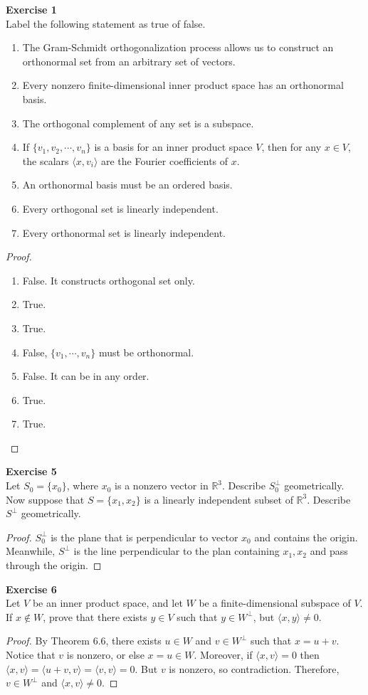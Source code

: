 \documentclass[12pt, a4paper]{article}
\theoremstyle{plain}
\newcommand{\R}{\mathbb{R}}
\newenvironment{exercise}[2][Exercise]
    { \begin{mdframed}[backgroundcolor=gray!20] \textbf{#1 #2} \\}
    {  \end{mdframed}}
\begin{document}
\begin{exercise}{1}
Label the following statement as true of false.
\begin{enumerate}[label=(\alph*)]
\item The Gram-Schmidt orthogonalization process allows us to construct an orthonormal set from an arbitrary set of vectors.
\item Every nonzero finite-dimensional inner product space has an orthonormal basis.
\item The orthogonal complement of any set is a subspace.
\item If $\{v_1,v_2,\cdots,v_n\}$ is a basis for an inner product space $V$, then for any $x\in V$, the scalars $\langle{x,v_i}\rangle$ are the Fourier coefficients of $x$.
\item An orthonormal basis must be an ordered basis.
\item Every orthogonal set is linearly independent.
\item Every orthonormal set is linearly independent.
\end{enumerate}
\end{exercise}
\begin{proof}
\hfill
\begin{enumerate}[label=(\alph*)]
\item False. It constructs orthogonal set only.
\item True.
\item True.
\item False, $\{v_1,\cdots,v_n\}$ must be orthonormal.
\item False. It can be in any order.
\item True.
\item True.
\end{enumerate}
\end{proof}

\begin{exercise}{5}
Let $S_0=\{x_0\}$, where $x_0$ is a nonzero vector in $\R^3$. Describe $S_0^\perp$ geometrically. Now suppose that $S=\{x_1,x_2\}$ is a linearly independent subset of $\R^3$. Describe $S^\perp$ geometrically.
\end{exercise}
	\begin{proof}
	$S^\perp_0$ is the plane that is perpendicular to vector $x_0$ and contains the origin. Meanwhile, $S^\perp$ is the line perpendicular to the plan containing $x_1,x_2$ and pass through the origin. 
	\end{proof}

\begin{exercise}{6}
Let $V$ be an inner product space, and let $W$ be a finite-dimensional subspace of $V$. If $x\notin W$, prove that there exists $y\in V$ such that $y\in W^\perp$, but $\langle{x,y}\rangle\neq 0$.
\end{exercise}
	\begin{proof}
	By Theorem 6.6, there exists $u\in W$ and $v\in W^\perp$ such that $x = u+v$. Notice that $v$ is nonzero, or else $x=u\in W$. Moreover, if $\langle{x,v}\rangle = 0$ then $\langle{x,v}\rangle=\langle{u+v,v}\rangle=\langle{v,v}\rangle=0$. But $v$ is nonzero, so contradiction. Therefore, $v\in W^\perp$ and $\langle{x,v}\rangle\neq 0$.
	\end{proof}
\end{document}
